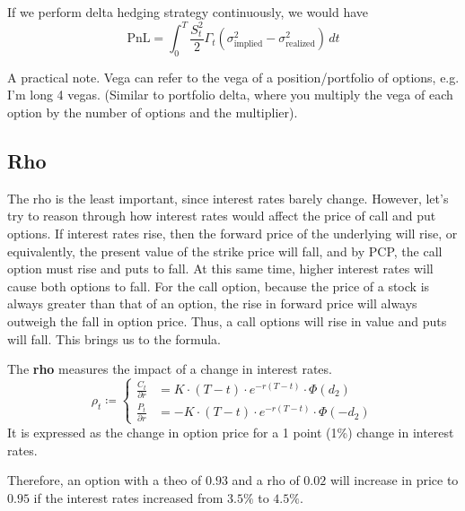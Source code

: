\documentclass{article}
\begin{document}
    If we perform delta hedging strategy continuously, we would have 
    \begin{equation}
      \text{PnL} = \int_0^T \frac{S_t^2}{2} \Gamma_t (\sigma_{\text{implied}}^2 - \sigma_{\text{realized}}^2 )\, dt
    \end{equation}

    A practical note. Vega can refer to the vega of a position/portfolio of options, e.g. I'm long 4 vegas. (Similar to portfolio delta, where you multiply the vega of each option by the number of options and the multiplier).

  \subsection{Rho}

    The rho is the least important, since interest rates barely change. However, let's try to reason through how interest rates would affect the price of call and put options. If interest rates rise, then the forward price of the underlying will rise, or equivalently, the present value of the strike price will fall, and by PCP, the call option must rise and puts to fall. At this same time, higher interest rates will cause both options to fall. For the call option, because the price of a stock is always greater than that of an option, the rise in forward price will always outweigh the fall in option price. Thus, a call options will rise in value and puts will fall. This brings us to the formula. 

    \begin{definition}[Rho]
      The \textbf{rho} measures the impact of a change in interest rates. 
      \begin{equation}
        \rho_t \coloneqq \begin{cases} 
          \frac{C_t}{\partial r} & = K \cdot (T - t) \cdot e^{-r (T - t)} \cdot \Phi(d_2) \\ 
          \frac{P_t}{\partial r} & = -K \cdot (T - t) \cdot e^{-r (T - t)} \cdot \Phi(-d_2)
        \end{cases}
      \end{equation}
      It is expressed as the change in option price for a 1 point (1\%) change in interest rates.  
    \end{definition}

    Therefore, an option with a theo of $0.93$ and a rho of $0.02$ will increase in price to $0.95$ if the interest rates increased from $3.5\%$ to $4.5\%$.  
\end{document}
